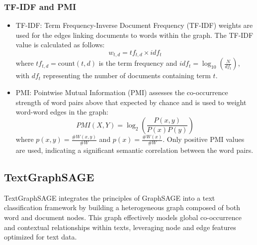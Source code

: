 \documentclass{article}
\begin{document}
\subsubsection{TF-IDF and PMI}
\begin{itemize}
    \item TF-IDF: Term Frequency-Inverse Document Frequency (TF-IDF) weights are used for the edges linking documents to words within the graph. The TF-IDF value is calculated as follows:
    \begin{equation}
    w_{t,d} = tf_{t,d} \times idf_t
    \end{equation}
    where $tf_{t,d} = \text{count}(t, d)$ is the term frequency and $idf_t = \log_{10} \left(\frac{N}{df_t}\right)$, with $df_t$ representing the number of documents containing term $t$.

    \item PMI: Pointwise Mutual Information (PMI) assesses the co-occurrence strength of word pairs above that expected by chance and is used to weight word-word edges in the graph:
    \begin{equation}
    PMI(X,Y) = \log_2 \left( \frac{P(x,y)}{P(x)P(y)} \right)
    \end{equation}
    where $p(x,y) = \frac{\#W(x, y)}{\#W}$ and $p(x) = \frac{\#W(x)}{\#W}$. Only positive PMI values are used, indicating a significant semantic correlation between the word pairs.
\end{itemize}

\subsection{TextGraphSAGE}

TextGraphSAGE integrates the principles of GraphSAGE into a text classification framework by building a heterogeneous graph composed of both word and document nodes. This graph effectively models global co-occurrence and contextual relationships within texts, leveraging node and edge features optimized for text data.
\end{document}
